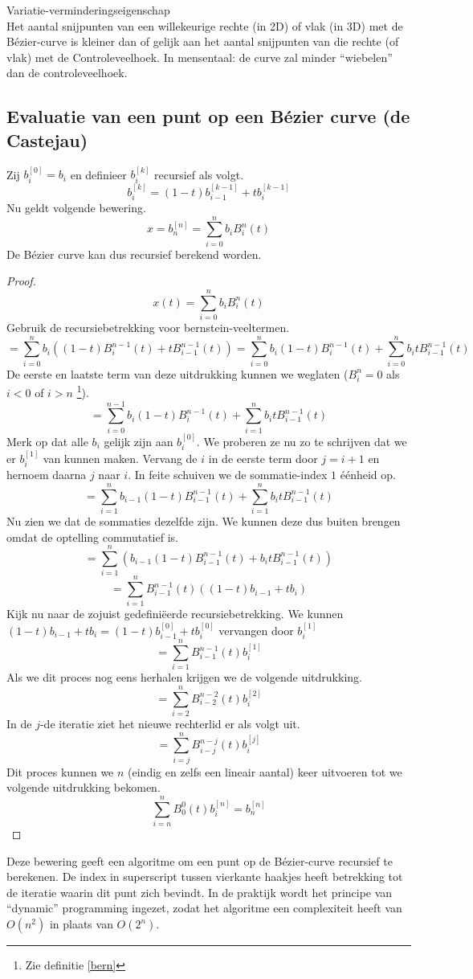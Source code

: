 \documentclass[computergesteund_ontwerp_van_curven_en_oppervlakken.tex]{subfiles}
\begin{document}
\begin{ei}
Variatie-verminderingseigenschap\\
Het aantal snijpunten van een willekeurige rechte (in 2D) of vlak (in 3D) met de B\'ezier-curve is kleiner dan of gelijk aan het aantal snijpunten van die rechte (of vlak) met de Controleveelhoek. In mensentaal: de curve zal minder ``wiebelen'' dan de controleveelhoek.
\end{ei}

\subsection{Evaluatie van een punt op een B\'ezier curve (de Castejau)}
\label{de_casteljau}
\begin{st}
Zij $b_{i}^{[0]} = b_{i}$ en definieer $b_{i}^{[k]}$ recursief als volgt.
\[
b_{i}^{[k]}
=
(1-t)b_{i-1}^{[k-1]} + tb_{i}^{[k-1]}
\]
Nu geldt volgende bewering.
\[
x = b_{n}^{[n]} = \sum_{i=0}^{n}b_iB_{i}^{n}(t)
\]
De B\'ezier curve kan dus recursief berekend worden.
\begin{proof}
\[
x(t) = \sum_{i=0}^{n}b_iB_{i}^{n}(t)
\]
Gebruik de recursiebetrekking voor bernstein-veeltermen.
\[
= \sum_{i=0}^{n}b_i
\left( 
(1-t)B^{n-1}_{i}(t) + tB^{n-1}_{i-1}(t)
\right)
= 
\sum_{i=0}^{n}b_i
(1-t)B^{n-1}_{i}(t) + 
\sum_{i=0}^{n}b_it
B^{n-1}_{i-1}(t)
\]
De eerste en laatste term van deze uitdrukking kunnen we weglaten ($B_{i}^{n} = 0$ als $i < 0$ of $i > n$ \footnote{Zie definitie \ref{bern}}).
\[
= 
\sum_{i=0}^{n-1}b_i
(1-t)B^{n-1}_{i}(t) + 
\sum_{i=1}^{n}b_it
B^{n-1}_{i-1}(t)
\]
Merk op dat alle $b_i$ gelijk zijn aan $b_i^{[0]}$. We proberen ze nu zo te schrijven dat we er $b_i^{[1]}$ van kunnen maken. Vervang de $i$ in de eerste term door $j=i+1$ en hernoem daarna $j$ naar $i$. In feite schuiven we de sommatie-index $1$ \'e\'enheid op.
\[
= 
\sum_{i=1}^{n}b_{i-1}
(1-t)B^{n-1}_{i-1}(t) + 
\sum_{i=1}^{n}b_it
B^{n-1}_{i-1}(t)
\]
Nu zien we dat de sommaties dezelfde zijn. We kunnen deze dus buiten brengen omdat de optelling commutatief is.
\[
= 
\sum_{i=1}^{n}
\left(
b_{i-1}(1-t)B^{n-1}_{i-1}(t)
+ 
b_itB^{n-1}_{i-1}(t)
\right)
\]
\[
= 
\sum_{i=1}^{n}
B^{n-1}_{i-1}(t)
\left(
(1-t)b_{i-1}
+ 
tb_i
\right)
\]
Kijk nu naar de zojuist gedefini\"eerde recursiebetrekking. We kunnen $(1-t)b_{i-1} + tb_i = (1-t)b_{i-1}^{[0]} + tb_i^{[0]}$ vervangen door $b_{i}^{[1]}$
\[
= 
\sum_{i=1}^{n}
B^{n-1}_{i-1}(t)
b_{i}^{[1]}
\]
Als we dit proces nog eens herhalen krijgen we de volgende uitdrukking.
\[
= 
\sum_{i=2}^{n}
B^{n-2}_{i-2}(t)
b_{i}^{[2]}
\]
In de $j$-de iteratie ziet het nieuwe rechterlid er als volgt uit.
\[
= 
\sum_{i=j}^{n}
B^{n-j}_{i-j}(t)
b_{i}^{[j]}
\]
Dit proces kunnen we $n$ (eindig en zelfs een lineair aantal) keer uitvoeren tot we volgende uitdrukking bekomen.
\[
\sum_{i=n}^{n}
B^{0}_{0}(t)
b_{i}^{[n]}
= b_{n}^{[n]}
\]
\end{proof}
\end{st}
Deze bewering geeft een algoritme om een punt op de B\'ezier-curve recursief te berekenen. De index in superscript tussen vierkante haakjes heeft betrekking tot de iteratie waarin dit punt zich bevindt. In de praktijk wordt het principe van ``dynamic'' programming ingezet, zodat het algoritme een complexiteit heeft van $O(n^2)$ in plaats van $O(2^n)$.
\end{document}
